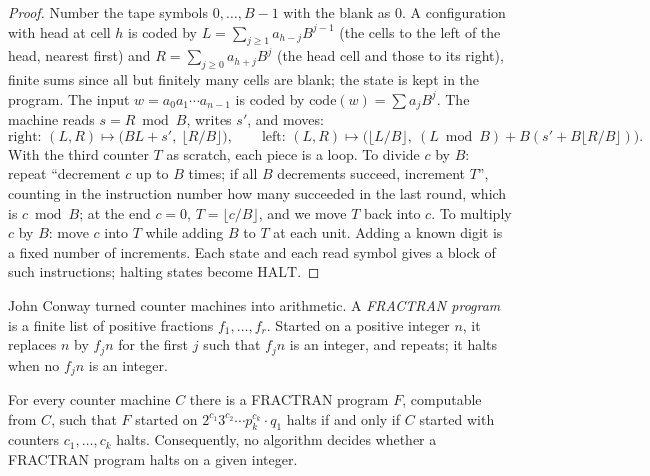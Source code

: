 \begin{proof}
Number the tape symbols $0,\dots,B-1$ with the blank as $0$. A configuration with head at cell $h$ is coded by $L=\sum_{j\ge1}a_{h-j}B^{j-1}$ (the cells to the left of the head, nearest first) and $R=\sum_{j\ge0}a_{h+j}B^j$ (the head cell and those to its right), finite sums since all but finitely many cells are blank; the state is kept in the program. The input $w=a_0a_1\cdots a_{n-1}$ is coded by $\mathrm{code}(w)=\sum a_jB^j$. The machine reads $s=R\bmod B$, writes $s'$, and moves:
\[
\text{right: } (L,R)\mapsto\bigl(BL+s',\ \lfloor R/B\rfloor\bigr),\qquad
\text{left: } (L,R)\mapsto\bigl(\lfloor L/B\rfloor,\ (L\bmod B)+B(s'+B\lfloor R/B\rfloor)\bigr).
\]
With the third counter $T$ as scratch, each piece is a loop. To divide $c$ by $B$: repeat ``decrement $c$ up to $B$ times; if all $B$ decrements succeed, increment $T$'', counting in the instruction number how many succeeded in the last round, which is $c\bmod B$; at the end $c=0$, $T=\lfloor c/B\rfloor$, and we move $T$ back into $c$. To multiply $c$ by $B$: move $c$ into $T$ while adding $B$ to $T$ at each unit. Adding a known digit is a fixed number of increments. Each state and each read symbol gives a block of such instructions; halting states become $\mathrm{HALT}$.
\end{proof}

John Conway turned counter machines into arithmetic. A \emph{FRACTRAN program} is a finite list of positive fractions $f_1,\dots,f_r$. Started on a positive integer $n$, it replaces $n$ by $f_jn$ for the first $j$ such that $f_jn$ is an integer, and repeats; it halts when no $f_jn$ is an integer.

\begin{theorem}[Conway, 1987]\label{thm:fractran}
For every counter machine $C$ there is a FRACTRAN program $F$, computable from $C$, such that $F$ started on $2^{c_1}3^{c_2}\cdots p_k^{c_k}\cdot q_1$ halts if and only if $C$ started with counters $c_1,\dots,c_k$ halts. Consequently, no algorithm decides whether a FRACTRAN program halts on a given integer.
\end{theorem}


